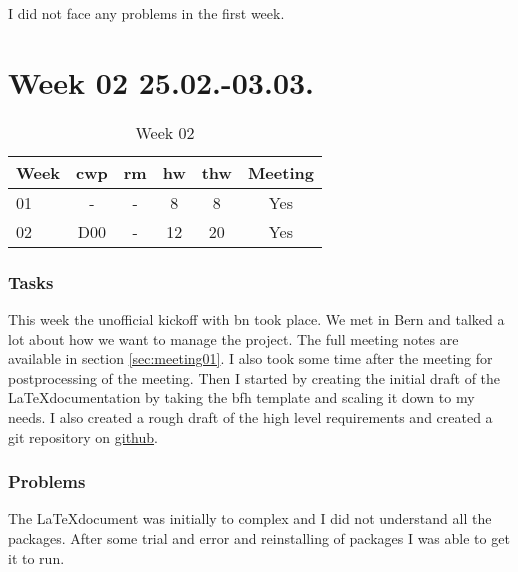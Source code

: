 I did not face any problems in the first week.

\section{Week 02 25.02.-03.03.}
\label{sec:journal:week02}

\begin{table}[!ht]
    \begin{center}
        \caption{Week 02}
        \label{tab:journal:week02}
        \begin{tabular}{l|c|c|c|c|c}
            \textbf{Week} & \textbf{\gls{cwp}} & \textbf{\gls{rm}} & \textbf{\gls{hw}} & \textbf{\gls{thw}} & \textbf{Meeting}\\
        \hline
        01 & - & - & 8 & 8 & Yes \\
        02 & D00 & - & 12 & 20 & Yes \\
        \end{tabular}
    \end{center}
\end{table}

\subsubsection{Tasks}

This week the unofficial kickoff with \gls{bn} took place. We met in Bern and talked a lot about how we want to manage the project. The full meeting notes are available in section \ref{sec:meeting01}. I also took some time after the meeting for postprocessing of the meeting. Then I started by creating the initial draft of the \LaTeX documentation by taking the \gls{bfh} template and scaling it down to my needs. I also created a rough draft of the high level requirements and created a \gls{git} repository on \href{https://github.com/Tartori/hids_thesis}{github}. 

\subsubsection{Problems}

The \LaTeX document was initially to complex and I did not understand all the packages. After some trial and error and reinstalling of packages I was able to get it to run. 

